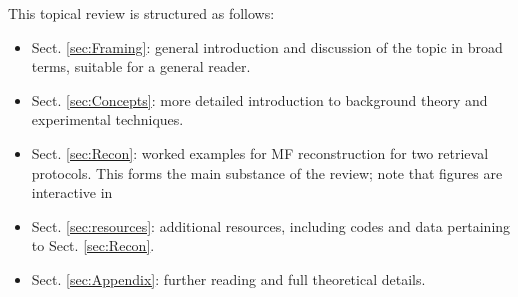 This topical review is structured as follows:

\begin{itemize}
\item Sect. \ref{sec:Framing}: general introduction and discussion of the topic in broad terms, suitable for a general reader.
\item Sect. \ref{sec:Concepts}: more detailed introduction to background theory and experimental techniques.
\item Sect. \ref{sec:Recon}: worked examples for MF reconstruction for two retrieval protocols. This forms the main substance of the review; note that figures are interactive in 
\item Sect. \ref{sec:resources}: additional resources, including codes and data pertaining to Sect. \ref{sec:Recon}.
\item Sect. \ref{sec:Appendix}: further reading and full theoretical details.
\end{itemize}